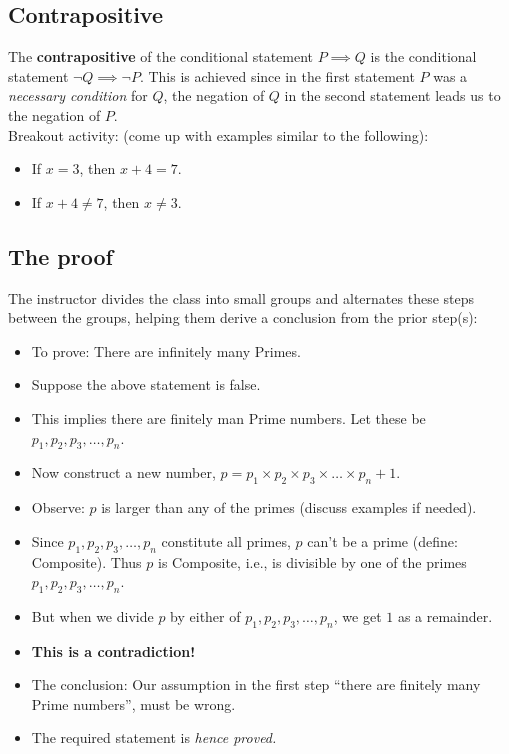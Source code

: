 \documentclass{article}
\begin{document}
\subsection*{Contrapositive}
The \textbf{contrapositive} of the conditional statement
$P \implies Q$ is the conditional statement
$\neg{Q} \implies \neg{P}$. This is achieved since in the first statement
$P$ was a \textit{necessary condition} for $Q$, the negation of $Q$ in the second 
statement leads us to the negation of $P$.\\

Breakout activity: (come up with examples similar to the following):
\begin{itemize}
  \item If $x=3$, then $x+4=7$.
  \item If $x+4 \ne 7$, then $x\ne 3$.
\end{itemize}

\subsection*{The proof}
The instructor divides the class into small groups
and alternates these steps between the groups, helping 
them derive a conclusion from the prior step(s):
\begin{itemize}
  \item To prove: There are infinitely many Primes.
  \item Suppose the above statement is false.
  \item This implies there are finitely man Prime numbers.
    Let these be $p_1,p_2,p_3,\dots,p_n$.
  \item Now construct a new number, 
    $p=p_1 \times p_2 \times p_3 \times \dots \times p_n + 1.$
  \item Observe: $p$ is larger than any of the primes (discuss examples if needed).
  \item Since $p_1,p_2,p_3,\dots,p_n$ constitute all primes,
    $p$ can't be a prime (define: Composite). Thus $p$ is Composite,
    i.e., is divisible by one of the primes $p_1,p_2,p_3,\dots,p_n$.
  \item But when we divide $p$ by either of $p_1,p_2,p_3,\dots,p_n$,
    we get $1$ as a remainder.
  \item \textbf{This is a contradiction!}
  \item The conclusion: Our assumption in the first step ``there
    are finitely many Prime numbers'', must be wrong.
  \item The required statement is \textit{hence proved.}
\end{itemize}
\end{document}
